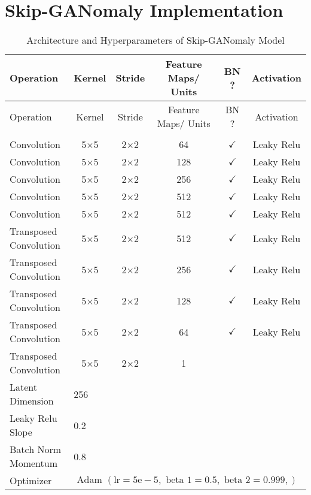 \section{Skip-GANomaly Implementation}
\label{app:sganomaly}
\footnotesize
\begin{longtable}[c]{@{}lccccc@{}}
	\caption{Architecture and Hyperparameters of Skip-GANomaly Model}
	\label{tab:sganomaly_imp}\\
	\toprule
	Operation & Kernel & Stride & Feature Maps/ Units & BN ? & Activation \\* \midrule
	\endfirsthead
	\toprule
	Operation & Kernel & Stride & Feature Maps/ Units & BN ? & Activation \\* \midrule
	\endhead
	\bottomrule
	\endfoot
	\endlastfoot
	\multicolumn{6}{l}{\textbf{Generator}} \\
	Convolution & \multicolumn{1}{c}{5$\times$5} & 2$\times$2 & 64 & $\checkmark$ & Leaky Relu \\
	Convolution & \multicolumn{1}{c}{5$\times$5} & 2$\times$2 & 128 & $\checkmark$ & Leaky Relu \\
	Convolution & \multicolumn{1}{c}{5$\times$5} & 2$\times$2 & 256 & $\checkmark$ & Leaky Relu \\
	Convolution & \multicolumn{1}{c}{5$\times$5} & 2$\times$2 & 512 & $\checkmark$ & Leaky Relu \\
	Convolution & \multicolumn{1}{c}{5$\times$5} & 2$\times$2 & 512 & $\checkmark$ & Leaky Relu \\
	Transposed Convolution & \multicolumn{1}{c}{5$\times$5} & 2$\times$2 & 512 & $\checkmark$ & Leaky Relu \\
	Transposed Convolution & \multicolumn{1}{c}{5$\times$5} & 2$\times$2 & 256 & $\checkmark$ & Leaky Relu \\
	Transposed Convolution & \multicolumn{1}{c}{5$\times$5} & 2$\times$2 & 128 & $\checkmark$ & Leaky Relu \\
	Transposed Convolution & \multicolumn{1}{c}{5$\times$5} & 2$\times$2 & 64 & $\checkmark$ & Leaky Relu \\
	Transposed Convolution & \multicolumn{1}{c}{5$\times$5} & 2$\times$2 & 1 &  &  \\
	Latent Dimension & \multicolumn{5}{l}{256} \\
	Leaky Relu Slope & \multicolumn{5}{l}{0.2} \\
	Batch Norm Momentum & \multicolumn{5}{l}{0.8} \\
	Optimizer & \multicolumn{5}{l}{$\text { Adam }(\mathrm{lr}=5 \mathrm{e}-5, \text { beta } 1=0.5, \text { beta } 2=0.999,)$} \\ \hline

\end{longtable}
